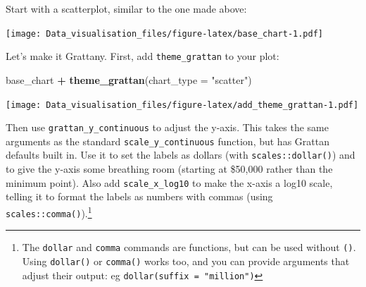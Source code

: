 \documentclass[]{book}
\newenvironment{Shaded}{\begin{snugshade}}{\end{snugshade}}
\newcommand{\DataTypeTok}[1]{\textcolor[rgb]{0.13,0.29,0.53}{#1}}
\newcommand{\FloatTok}[1]{\textcolor[rgb]{0.00,0.00,0.81}{#1}}
\newcommand{\KeywordTok}[1]{\textcolor[rgb]{0.13,0.29,0.53}{\textbf{#1}}}
\newcommand{\NormalTok}[1]{#1}
\newcommand{\OperatorTok}[1]{\textcolor[rgb]{0.81,0.36,0.00}{\textbf{#1}}}
\newcommand{\StringTok}[1]{\textcolor[rgb]{0.31,0.60,0.02}{#1}}
\let\rmarkdownfootnote\footnote%
\def\footnote{\protect\rmarkdownfootnote}
\begin{document}
Start with a scatterplot, similar to the one made above:

\begin{Shaded}
\end{Shaded}

\texttt{[image: Data\_visualisation\_files/figure-latex/base\_chart-1.pdf]}

Let's make it Grattany. First, add \texttt{theme\_grattan} to your plot:

\begin{Shaded}
\begin{Highlighting}[]
\NormalTok{base_chart }\OperatorTok{+}
\StringTok{        }\KeywordTok{theme_grattan}\NormalTok{(}\DataTypeTok{chart_type =} \StringTok{"scatter"}\NormalTok{)}
\end{Highlighting}
\end{Shaded}

\texttt{[image: Data\_visualisation\_files/figure-latex/add\_theme\_grattan-1.pdf]}

Then use \texttt{grattan\_y\_continuous} to adjust the y-axis. This takes the same arguments as the standard \texttt{scale\_y\_continuous} function, but has Grattan defaults built in. Use it to set the labels as dollars (with \texttt{scales::dollar()}) and to give the y-axis some breathing room (starting at \$50,000 rather than the minimum point).
Also add \texttt{scale\_x\_log10} to make the x-axis a log10 scale, telling it to format the labels as numbers with commas (using \texttt{scales::comma()}).\footnote{The \texttt{dollar} and \texttt{comma} commands are functions, but can be used without \texttt{()}. Using \texttt{dollar()} or \texttt{comma()} works too, and you can provide arguments that adjust their output: eg \texttt{dollar(suffix\ =\ "million")}}
\end{document}
